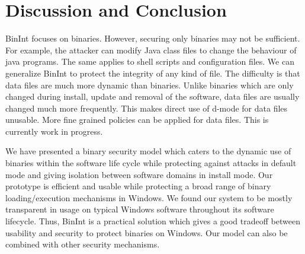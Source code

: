\section{Discussion and Conclusion}
\label{sec:conc}

BinInt focuses on binaries.
However, securing only binaries may not be sufficient.
For example, the attacker can modify Java class files to
change the behaviour of java programs.
The same applies to shell scripts and configuration files.
We can generalize BinInt to protect the integrity of any kind of file.
The difficulty is that data files are much more dynamic than binaries.
Unlike binaries which are only changed during install, update and removal
of the software, data files are usually changed much more frequently.
This makes direct use of d-mode for data files unusable.
More fine grained policies can be applied for data files.
This is currently work in progress.

We have presented a binary security model which caters to the
dynamic use of binaries within the software life cycle
while protecting against attacks in default mode
and giving isolation between software domains in install mode.
Our prototype is efficient and usable while
protecting a broad range of binary loading/execution mechanisms in Windows.
We found our system to be mostly transparent in usage on typical
Windows software throughout its software lifecycle.
Thus, BinInt is a practical solution
which gives a good tradeoff between usability and security
to protect binaries on Windows.
Our model can also be combined with other security mechanisms.

